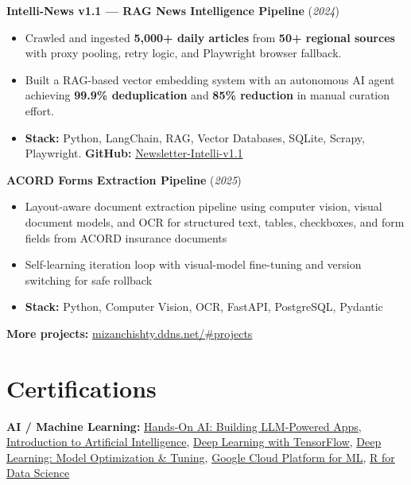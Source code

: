 \documentclass[10pt,letterpaper]{article}
\newcommand{\projheader}[2]{%
  \textbf{#1} (\textit{#2})
  \vspace{0.02cm}
}
\begin{document}
\projheader{Intelli-News v1.1 --- RAG News Intelligence Pipeline}{2024}
\begin{itemize}
  \item Crawled and ingested \textbf{5,000+ daily articles} from \textbf{50+ regional sources}
  with proxy pooling, retry logic, and Playwright browser fallback.
  \item Built a RAG-based vector embedding system with an autonomous AI agent achieving
  \textbf{99.9\% deduplication} and \textbf{85\% reduction} in manual curation effort.
  \item \textbf{Stack:} Python, LangChain, RAG, Vector Databases, SQLite, Scrapy, Playwright.
  \quad \textbf{GitHub:} \href{https://github.com/Mizan-muf/Newsletter-Intelli-version-1.1.0}{Newsletter-Intelli-v1.1}
\end{itemize}

\vspace{0.08cm}

\projheader{ACORD Forms Extraction Pipeline}{2025}
\begin{itemize}
  \item Layout-aware document extraction pipeline using computer vision, visual document models,
  and OCR for structured text, tables, checkboxes, and form fields from ACORD insurance documents
  \item Self-learning iteration loop with visual-model fine-tuning and version switching for safe rollback
  \item \textbf{Stack:} Python, Computer Vision, OCR, FastAPI, PostgreSQL, Pydantic
\end{itemize}

\vspace{0.05cm}
\noindent\textbf{More projects:} \href{https://mizanchishty.ddns.net/\#projects}{mizanchishty.ddns.net/\#projects}

\vspace{0.05cm}

\section{Certifications}

\noindent
\textbf{AI / Machine Learning:}
\href{https://www.linkedin.com/learning/certificates/9fd3c7aac08df00e7bd910ba2ddf330de3ddd54b14f48c74923e55dc633d096a}{Hands-On AI: Building LLM-Powered Apps},
\href{https://www.linkedin.com/learning/certificates/699efc9ed8fb2419bc9c506e3cb97cf91e540e8d88a3c0f7b9b9dbe8b59dc786}{Introduction to Artificial Intelligence},
\href{https://www.linkedin.com/learning/certificates/6b11ba7b0547ec739724ecda0df645128b7741fbfc9a2d458a8a850cf9be384f}{Deep Learning with TensorFlow},
\href{https://www.linkedin.com/learning/certificates/71a636520507579ad303e5b71618ea025b971521e967830719874201ce2de906}{Deep Learning: Model Optimization \& Tuning},
\href{https://www.linkedin.com/learning/certificates/b79f4dde22949acc6dced9795615c8d63376648cf0cb27f03d97007fbadeb957}{Google Cloud Platform for ML},
\href{https://www.linkedin.com/learning/certificates/2dd54d1e822f5411bd44cf1693401ff446ea4c2dffa195e85fafc7eb75fb5e7b}{R for Data Science}\\[0.1cm]
\end{document}

